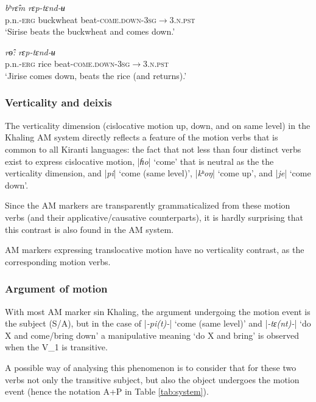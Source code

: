 \documentclass[oneside,a4paper,11pt]{article}
\newcommand{\ipa}[1]{{\phon\textit{#1}}}
\newcommand{\dhatu}[2]{|\ipa{#1}| `#2'}
\begin{document}
 \begin{exe}
\ex \label{ex:ryaptyandyu1}
  \gll   \ipa{siriseʔ-ɛ} \ipa{bʰrɛ̂m}  \ipa{rɛp-tɛnd-ʉ} \\
   p.n.-\textsc{erg} buckwheat beat-\textsc{come.down}-\textsc{3sg$\rightarrow$3.n.pst} \\
\glt `Sirise beats the buckwheat and comes down.'
 \end{exe}
 
 
 \begin{exe}
\ex \label{ex:ryaptyandyu2}
 \gll   \ipa{dzirise-ʔɛ} \ipa{rɵ̂:} \ipa{rɛp-tɛnd-ʉ} \\
 p.n.-\textsc{erg} rice beat-\textsc{come.down}-\textsc{3sg$\rightarrow$3.n.pst} \\
\glt `Jirise comes down, beats the rice (and returns).'
 \end{exe}

 

 \subsubsection{Verticality and deixis} \label{sec:verticality.khaling}
 The verticality dimension (cislocative motion up, down, and on same level) in the Khaling AM system directly reflects a feature of the motion verbs that is common to all Kiranti languages: the fact that not less than four distinct verbs exist to express cislocative motion, \dhatu{ɦo}{come} that is neutral as the the verticality dimension, and \dhatu{pi}{come (same level)}, \dhatu{kʰoŋ}{come up}, and \dhatu{je}{come down}. 
 
 Since the AM markers are transparently grammaticalized from these motion verbs (and their applicative/causative counterparts), it is hardly surprising that this contrast is also found in the AM system.
 
 AM markers expressing translocative motion have no verticality contrast, as the corresponding motion verbs.
 
  \subsubsection{Argument of motion} \label{sec:argument.khaling}
With most AM marker sin Khaling, the argument undergoing the motion event is the subject (S/A), but in the case of  \dhatu{-pi(t)-}{come (same level)} and   \dhatu{-tɛ(nt)-}{do X and come/bring down} a manipulative meaning `do X and bring' is observed when the V_1 is transitive. 

A possible way of analysing this phenomenon is to consider that for these two verbs not only the transitive subject, but also the object undergoes the motion event (hence the notation A+P in Table \ref{tab:system}).
\end{document}
